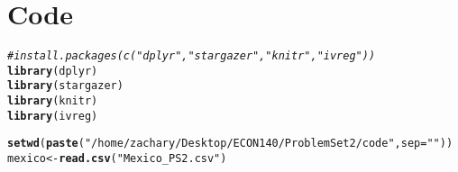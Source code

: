 \documentclass{article}\usepackage[]{graphicx}\usepackage[]{xcolor}
\makeatletter
\newcommand{\hlstr}[1]{\textcolor[rgb]{0.192,0.494,0.8}{#1}}%
\newcommand{\hlcom}[1]{\textcolor[rgb]{0.678,0.584,0.686}{\textit{#1}}}%
\newcommand{\hlstd}[1]{\textcolor[rgb]{0.345,0.345,0.345}{#1}}%
\newcommand{\hlkwb}[1]{\textcolor[rgb]{0.69,0.353,0.396}{#1}}%
\newcommand{\hlkwc}[1]{\textcolor[rgb]{0.333,0.667,0.333}{#1}}%
\newcommand{\hlkwd}[1]{\textcolor[rgb]{0.737,0.353,0.396}{\textbf{#1}}}%
\newenvironment{kframe}{%
 \def\at@end@of@kframe{}%
 \ifinner\ifhmode%
  \def\at@end@of@kframe{\end{minipage}}%
  \begin{minipage}{\columnwidth}%
 \fi\fi%
 \def\FrameCommand##1{\hskip\@totalleftmargin \hskip-\fboxsep
 \colorbox{shadecolor}{##1}\hskip-\fboxsep
     \hskip-\linewidth \hskip-\@totalleftmargin \hskip\columnwidth}%
 \MakeFramed {\advance\hsize-\width
   \@totalleftmargin\z@ \linewidth\hsize
   \@setminipage}}%
 {\par\unskip\endMakeFramed%
 \at@end@of@kframe}
\newenvironment{knitrout}{}{} %
\makeatother
\begin{document}
\section*{\centering Code}
\begin{knitrout}
\color{fgcolor}\begin{kframe}
\begin{alltt}
    \hlcom{#install.packages(c("dplyr", "stargazer", "knitr", "ivreg"))}
    \hlkwd{library}\hlstd{(dplyr)}
    \hlkwd{library}\hlstd{(stargazer)}
    \hlkwd{library}\hlstd{(knitr)}
    \hlkwd{library}\hlstd{(ivreg)}

    \hlkwd{setwd}\hlstd{(}\hlkwd{paste}\hlstd{(}\hlstr{"/home/zachary/Desktop/ECON 140/Problem Set 2/code"}\hlstd{,} \hlkwc{sep}\hlstd{=}\hlstr{""}\hlstd{))}
    \hlstd{mexico} \hlkwb{<-} \hlkwd{read.csv}\hlstd{(}\hlstr{"Mexico_PS2.csv"}\hlstd{)}


\end{alltt}
\end{kframe}
\end{knitrout}
\end{document}
